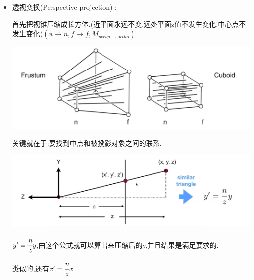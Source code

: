 \documentclass[UTF8,12pt]{ctexbook}
\begin{document}
{{{{\begin{itemize}
{\begin{itemize}
{                        \begin{itemize}
                          \item 注意:由于视线方向沿着-z,所以$n>f$
                          \item 这就是为啥OpenGL用的是左手系
                        \end{itemize}
                        }
                  \item {
                        透视变换(Perspective projection) :

                        首先把视锥压缩成长方体.(近平面永远不变,远处平面z值不发生变化,中心点不发生变化)$(n \to n,f \to f,M_{persp \to ortho})$

                        \includegraphics[scale=0.5]{resources/perspectiveProjection.png}

                        关键就在于:要找到中点和被投影对象之间的联系.

                        \includegraphics[scale=0.5]{resources/perspectiveProjection_middle.png}

                        $y^\prime = \cfrac{n}{z}y$,由这个公式就可以算出来压缩后的y,并且结果是满足要求的.

                        类似的,还有$x^\prime = \cfrac{n}{z}x$

}
\end{itemize}}
\end{itemize}}}}}
\end{document}
